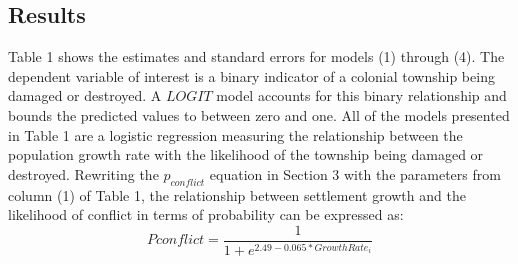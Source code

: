 \documentclass[sn-mathphys]{sn-jnl}%
\theoremstyle{thmstyleone}%
\theoremstyle{thmstyletwo}%
\theoremstyle{thmstylethree}%
\begin{document}
\subsection{Results}

Table 1 shows the estimates and standard errors for models (1) through (4). The dependent variable of interest is a binary indicator of a colonial township being damaged or destroyed. A $LOGIT$ model accounts for this binary relationship and bounds the predicted values to between zero and one. All of the models presented in Table 1 are a logistic regression measuring the relationship between the population growth rate with the likelihood of the township being damaged or destroyed. Rewriting the $p_{conflict}$ equation in Section 3 with the parameters from column (1) of Table 1, the relationship between settlement growth and the likelihood of conflict in terms of probability can be expressed as:
\begin{equation}
P{conflict}=\frac{1}{1+e^{2.49-0.065*GrowthRate_{i}}}
\end{equation}
\end{document}
